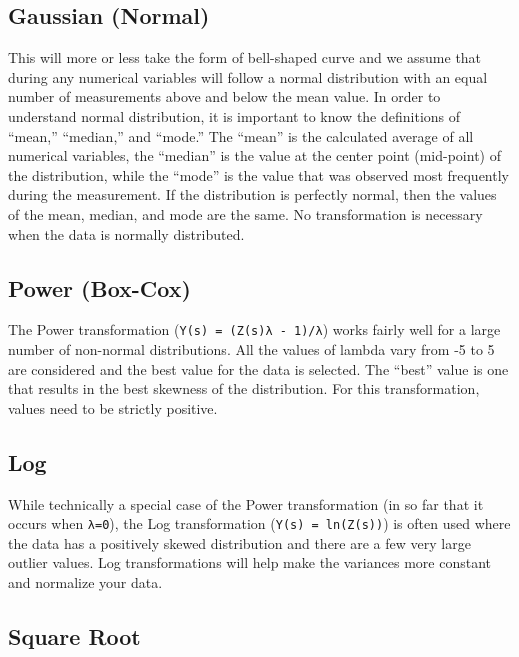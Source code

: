 \documentclass[
]{krantz}
\begin{document}
\hypertarget{gaussian-normal}{%
\subsection*{Gaussian (Normal)}\label{gaussian-normal}}


This will more or less take the form of bell-shaped curve and we assume that during any numerical variables will follow a normal distribution with an equal number of measurements above and below the mean value. In order to understand normal distribution, it is important to know the definitions of ``mean,'' ``median,'' and ``mode.'' The ``mean'' is the calculated average of all numerical variables, the ``median'' is the value at the center point (mid-point) of the distribution, while the ``mode'' is the value that was observed most frequently during the measurement. If the distribution is perfectly normal, then the values of the mean, median, and mode are the same. No transformation is necessary when the data is normally distributed.

\hypertarget{power-box-cox}{%
\subsection*{Power (Box-Cox)}\label{power-box-cox}}


The Power transformation (\texttt{Y(s)\ =\ (Z(s)λ\ -\ 1)/λ}) works fairly well for a large number of non-normal distributions. All the values of lambda vary from -5 to 5 are considered and the best value for the data is selected. The ``best'' value is one that results in the best skewness of the distribution. For this transformation, values need to be strictly positive.

\hypertarget{log}{%
\subsection*{Log}\label{log}}


While technically a special case of the Power transformation (in so far that it occurs when \texttt{λ=0}), the Log transformation (\texttt{Y(s)\ =\ ln(Z(s))}) is often used where the data has a positively skewed distribution and there are a few very large outlier values. Log transformations will help make the variances more constant and normalize your data.

\hypertarget{square-root}{%
\subsection*{Square Root}\label{square-root}}
\end{document}
